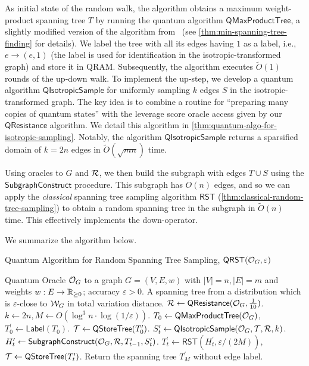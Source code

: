 \documentclass[11pt]{article}
\newcommand{\abss}[1]{\left\lvert #1 \right\rvert}
\newcommand{\parens}[1]{( #1 )}
\newcommand{\QRST}{\mathsf{QRST}} \newcommand{\RST}{\mathsf{RST}} \newcommand{\SubgraphConstruct}{\mathsf{SubgraphConstruct}} \newcommand{\QResistance}{\mathsf{QResistance}} \newcommand{\Label}{\mathsf{Label}} \newcommand{\QStoreTree}{\mathsf{QStoreTree}} \newcommand{\QMaxProductTree}{\mathsf{QMaxProductTree}} \newcommand{\QIsoSample}{\mathsf{QIsotropicSample}}
\begin{document}
{As initial state of the random walk, the algorithm obtains a maximum weight-product spanning tree $T$ by running the quantum algorithm
$\QMaxProductTree$, a slightly modified version of the algorithm from~\cite{DHHM06} (see \cref{thm:min-spanning-tree-finding} for details).
We label the tree with all its edges having $1$ as a label, i.e., $e\to (e, 1)$
(the label is used for identification in the isotropic-transformed graph) and
store it in QRAM\@.
Subsequently, the algorithm executes $\widetilde{O}(1)$ rounds of the up-down
walk.
To implement the up-step, we develop a quantum algorithm $\QIsoSample$
for uniformly sampling $k$ edges $S$ in the isotropic-transformed graph.
The key idea is to combine a routine for ``preparing many copies of quantum
states'' with the leverage score oracle access given by our
$\QResistance$ algorithm.
We detail this algorithm in \cref{thm:quantum-algo-for-isotropic-sampling}.
Notably, the algorithm $\QIsoSample$ returns a sparsified domain of
$k = 2n$ edges in $\widetilde{O}(\sqrt{mn})$ time.

Using oracles to $G$ and $\mathcal{R}$, we then build the subgraph with edges $T \cup S$
using the $\SubgraphConstruct$ procedure.
This subgraph has $O(n)$ edges, and so we can apply the \emph{classical}
spanning tree sampling algorithm $\RST$
(\cref{thm:classical-random-tree-sampling}) to obtain a random spanning tree in
the subgraph in $\widetilde{O}(n)$ time.
This effectively implements the down-operator.

We summarize the algorithm below.

\begin{algorithm}[H]
  \caption{Quantum Algorithm for Random Spanning Tree Sampling,
    $\QRST(\cO_G,\varepsilon)$}\label{alg:qust}
  \begin{algorithmic}[1] \REQUIRE{} Quantum Oracle $\mathcal{O} _G$ to a graph $G=(V,E,w)$ with
    $\abss{V}=n,\abss{E}=m$ and weights $w: E\to \mathbb{R}_{\geq0}$; accuracy $\varepsilon >0$.
    \ENSURE{} A spanning tree from a distribution which is $\varepsilon$-close to $\mathcal{W}_G$ in total variation distance.
    \STATE{} $\cR \gets \QResistance(\cO_G, \frac{1}{10})$.
    \STATE{} 
    $k\gets 2 n, M \gets O \parens{\log ^3 n\cdot \log (1/\varepsilon)}$.
    \STATE{} $T_{0}\gets \QMaxProductTree(\cO_{G})$,
    $T_{0}^\prime\gets \Label\parens{T_0}$.
    \STATE{}  $\cT\gets \QStoreTree(T_0^\prime)$.
    \STATE{} $S^\prime_{t}\gets \QIsoSample(\cO_{G}, \cT, \cR, k)$.
    \STATE{} $H_{t}^\prime\gets \SubgraphConstruct\parens{\cO_G,\cR, T^{\prime}_{t-1}, S_{t}^\prime}$.
    \STATE{} $T_t^\prime\gets \RST\parens{H^{\prime}_t, \varepsilon/\parens{2M}}$, $\cT\gets \QStoreTree(T_t^\prime)$.
    \ENDFOR{}
    \STATE{} Return the spanning tree $T^\prime_{M}$ without edge label.
  \end{algorithmic}
\end{algorithm}

}
\end{document}
